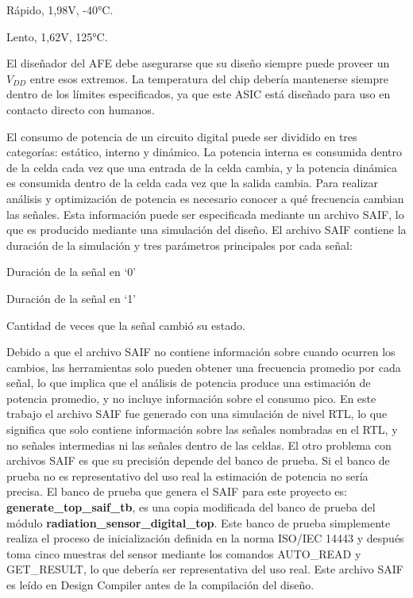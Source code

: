 \documentclass[a4paper, twoside, 11pt]{report}
\begin{document}
\begin{description}[labelindent=1cm]
  \item [Best Case:] Rápido, 1,98V, -40°C.
  \item [Worst Case:] Lento, 1,62V, 125°C.
\end{description}

El diseñador del AFE debe asegurarse que su diseño siempre puede proveer un $V_{DD}$ entre esos extremos. La temperatura del chip debería mantenerse siempre dentro de los límites especificados, ya que este ASIC está diseñado para uso en contacto directo con humanos.

El consumo de potencia de un circuito digital puede ser dividido en tres categorías: estático, interno y dinámico. La potencia interna es consumida dentro de la celda cada vez que una entrada de la celda cambia, y la potencia dinámica es consumida dentro de la celda cada vez que la salida cambia. Para realizar análisis y optimización de potencia es necesario conocer a qué frecuencia cambian las señales. Esta información puede ser especificada mediante un archivo SAIF, lo que es producido mediante una simulación del diseño. El archivo SAIF contiene la duración de la simulación y tres parámetros principales por cada señal:

\begin{description}[labelindent=1cm]
  \item [T0:] Duración de la señal en ‘0’
  \item [T1:] Duración de la señal en ‘1’
  \item [TC:] Cantidad de veces que la señal cambió su estado.
\end{description}

Debido a que el archivo SAIF no contiene información sobre cuando ocurren los cambios, las herramientas solo pueden obtener una frecuencia promedio por cada señal, lo que implica que el análisis de potencia produce una estimación de potencia promedio, y no incluye información sobre el consumo pico. En este trabajo el archivo SAIF fue generado con una simulación de nivel RTL, lo que significa que solo contiene información sobre las señales nombradas en el RTL, y no señales intermedias ni las señales dentro de las celdas. El otro problema con archivos SAIF es que su precisión depende del banco de prueba. Si el banco de prueba no es representativo del uso real la estimación de potencia no sería precisa. El banco de prueba que genera el SAIF para este proyecto es: \textbf{generate\_top\_saif\_tb}, es una copia modificada del banco de prueba del módulo \textbf{radiation\_sensor\_digital\_top}. Este banco de prueba simplemente realiza el proceso de inicialización definida en la norma ISO/IEC 14443 y después toma cinco muestras del sensor mediante los comandos AUTO\_READ y GET\_RESULT, lo que debería ser representativa del uso real. Este archivo SAIF es leído en Design Compiler antes de la compilación del diseño.
\end{document}
